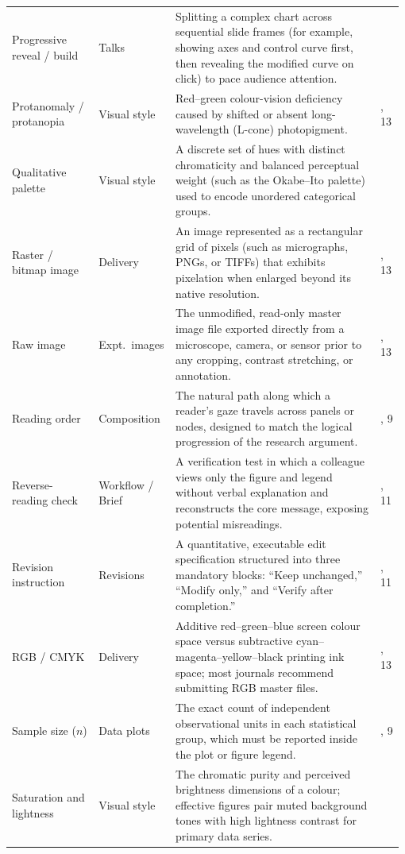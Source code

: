 \begin{longtable}{@{}>{\raggedright\arraybackslash}p{0.22\linewidth}>{\raggedright\arraybackslash}p{0.18\linewidth}>{\raggedright\arraybackslash}p{0.52\linewidth}>{\raggedright\arraybackslash}p{0.06\linewidth}@{}}
Progressive reveal / build & Talks & Splitting a complex chart across sequential slide frames (for example, showing axes and control curve first, then revealing the modified curve on click) to pace audience attention. & 12 \\
Protanomaly / protanopia & Visual style & Red--green colour-vision deficiency caused by shifted or absent long-wavelength (L-cone) photopigment. & 4, 13 \\
Qualitative palette & Visual style & A discrete set of hues with distinct chromaticity and balanced perceptual weight (such as the Okabe--Ito palette) used to encode unordered categorical groups. & 4 \\
Raster / bitmap image & Delivery & An image represented as a rectangular grid of pixels (such as micrographs, PNGs, or TIFFs) that exhibits pixelation when enlarged beyond its native resolution. & 8, 13 \\
Raw image & Expt.\ images & The unmodified, read-only master image file exported directly from a microscope, camera, or sensor prior to any cropping, contrast stretching, or annotation. & 8, 13 \\
Reading order & Composition & The natural path along which a reader's gaze travels across panels or nodes, designed to match the logical progression of the research argument. & 3, 9 \\
Reverse-reading check & Workflow / Brief & A verification test in which a colleague views only the figure and legend without verbal explanation and reconstructs the core message, exposing potential misreadings. & 2, 11 \\
Revision instruction & Revisions & A quantitative, executable edit specification structured into three mandatory blocks: ``Keep unchanged,'' ``Modify only,'' and ``Verify after completion.'' & 3, 11 \\
RGB / CMYK & Delivery & Additive red--green--blue screen colour space versus subtractive cyan--magenta--yellow--black printing ink space; most journals recommend submitting RGB master files. & 4, 13 \\
Sample size ($n$) & Data plots & The exact count of independent observational units in each statistical group, which must be reported inside the plot or figure legend. & 5, 9 \\
Saturation and lightness & Visual style & The chromatic purity and perceived brightness dimensions of a colour; effective figures pair muted background tones with high lightness contrast for primary data series. & 4 \\

\end{longtable}
